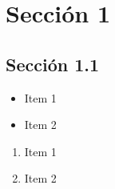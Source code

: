 \documentclass[12pt,a4paper,titlepage,twopages]{article}
\begin{document}
\thispagestyle{empty}
\newpage




\section{Sección 1}

\subsection{Sección 1.1}



\begin{itemize}
\item Item 1 
\item Item 2 
\end{itemize}




\begin{enumerate}
\item Item 1 
\item Item 2
\end{enumerate}
 
\end{document}

